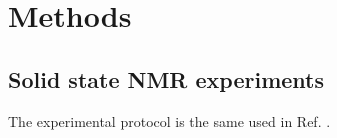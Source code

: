\documentclass[aps,prl,superscriptaddress,twocolumn]{revtex4}
\begin{document}



\section{Methods}

\subsection{Solid state NMR experiments}
The experimental protocol is the same used in Ref. .
\end{document}
